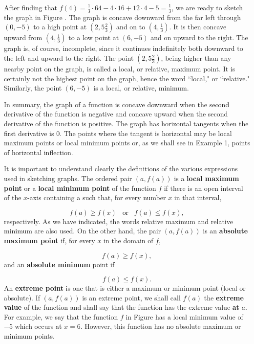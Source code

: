
After finding that $f(4) = \frac{1}{3} \cdot  64 - 4 \cdot 16 + 12 \cdot 4 - 5 = \frac{1}{3}$, we are ready to sketch the graph in Figure . The graph is concave downward from the far left through $(0, -5)$ to a high point at $(2, 5\frac{2}{3})$ and on to $(4, \frac{1}{3})$. It is then concave upward from $(4, \frac{1}{3})$ to a low point at $(6, -5)$ and on upward to the right. The graph is, of course, incomplete, since it continues indefinitely both downward to the left and upward to the right. The point $(2, 5\frac{2}{3})$, being higher than any nearby point on the graph, is called a local, or relative, maximum point. It is certainly not the highest point on the graph, hence the
word ``local," or ``relative." Similarly, the point $(6, -5)$ is a local, or relative, minimum.


In summary, the graph of a function is concave downward when the second derivative of the function is negative and concave upward when the second derivative of the function is positive. The graph has horizontal tangents when the first derivative is 0. The points where the tangent is horizontal may be local maximum points or local minimum points or, as we shall see in Example 1, points of horizontal inflection.

It is important to understand clearly the definitions of the various expressions used in sketching graphs. The ordered pair $(a,f(a))$ is a \textbf{local maximum point} or a \textbf{local minimum point} of the function $f$ if there is an open interval of the $x$-axis containing a such that, for every number $x$ in that interval, 

$$
f(a) \geq f(x)  \;\;\; \mbox{or} \;\;\; f(a) \leq f(x),
$$
\noindent respectively. As we have indicated, the words relative maximum and relative minimum are also used. On the other hand, the pair $(a, f(a))$ is an \textbf{absolute maximum point} if, for every $x$ in the domain of $f$,

$$
f(a) \geq f(x),
$$
and an \textbf{absolute minimum} point if

$$
f(a) \leq f(x).
$$
An \textbf{extreme point} is one that is either a maximum or minimum point (local or absolute). If $(a, f(a))$ is an extreme point, we shall call $f(a)$ the 
\textbf{extreme value} of the function and shall say that the function has the extreme value \textbf{at} $a$.  For example, we say that the function $f$ in Figure  has a local minimum value of $-5$ which occurs at $x = 6$. However, this function has no absolute maximum or minimum points.

